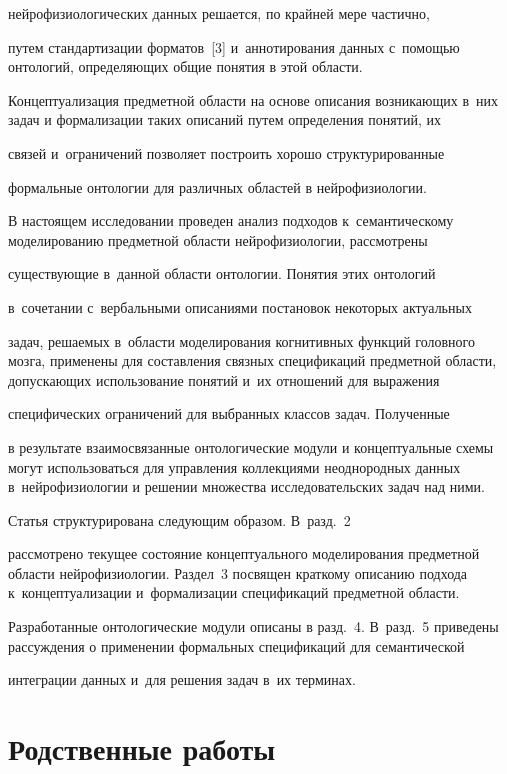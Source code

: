       нейрофизиологических данных решается, по крайней мере частично, 

      путем стандартизации форматов~[3] и~аннотирования данных с~помощью онтологий, определяющих общие понятия в этой области. 

      

      Концептуализация предметной области на основе описания возникающих в~них задач и формализации таких описаний путем определения понятий, их 

связей и~ограничений позволяет построить хорошо структурированные 

формальные онтологии для различных областей в нейрофизиологии.

      

      В настоящем исследовании проведен анализ подходов к~семантическому моделированию предметной области нейрофизиологии, рассмотрены 

существующие в~данной области онтологии. Понятия этих онтологий 

в~сочетании с~вербальными описаниями постановок некоторых актуальных 

задач, решаемых в~области моделирования когнитивных функций головного мозга, применены для составления связных спецификаций предметной области, допускающих использование понятий и~их отношений для выражения 

специфических ограничений для выбранных классов задач. Полученные 

в результате взаимосвязанные онтологические модули и концептуальные схемы могут использоваться для управления коллекциями неоднородных данных в~нейрофизиологии и решении множества исследовательских задач над ними.

      

      Статья структурирована следующим образом. В~разд.~2

 рассмотрено текущее состояние концептуального моделирования предметной области нейрофизиологии. Раздел~3 посвящен краткому описанию подхода к~концептуализации и~формализации спецификаций предметной области. 

Разработанные онтологические модули описаны в разд.~4. В~разд.~5 приведены рассуждения о применении формальных спецификаций для семантической 

интеграции данных и~для решения задач в~их терминах.



\section{Родственные работы}



